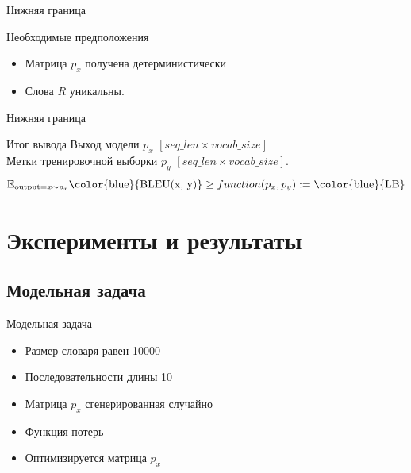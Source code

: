 \documentclass{beamer}					%
\begin{document}
    \begin{frame}{Нижняя граница}
        \begin{block}{Необходимые предположения}
            \begin{itemize}
            \item Матрица $p_x$ получена детерминистически
            \item Слова $R$ уникальны.
            \end{itemize}
        \end{block}       
        
    \end{frame}

    \begin{frame}{Нижняя граница}
        \begin{block}{Итог вывода}
        Выход модели $p_x$  $[seq\_len \times vocab\_size]$\\
        Метки тренировочной выборки $p_y$  $[seq\_len \times vocab\_size]$.
        $$\mathbb{E}_{\mathrm{output} = x \sim p_x} \textnormal{{\color{blue}{BLEU(x, y)}}} \ge function(p_x, p_y) := \textnormal{\color{blue}{LB}}$$
        \end{block}
    \end{frame}

    \section{Эксперименты и результаты}
    \subsection{Модельная задача}
    \begin{frame}{Модельная задача}
        \begin{itemize}
         \item   Размер словаря равен 10000

         \item   Последовательности длины 10

         \item   Матрица $p_x$ сгенерированная случайно

         \item  Функция потерь {\color{blue}{LB}}

         \item   Оптимизируется матрица $p_x$

        \end{itemize}
    \end{frame}
\end{document}

